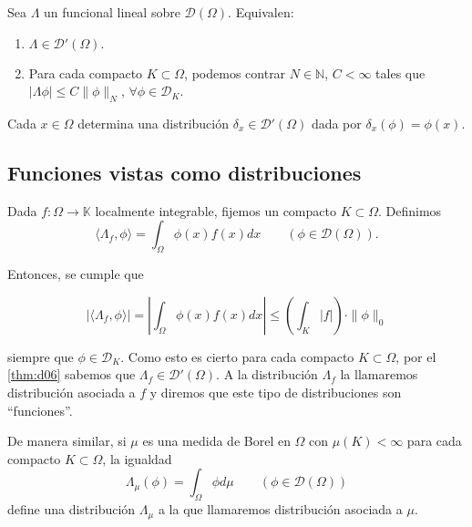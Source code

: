 \begin{teorema}\label{thm:d06}
Sea $\Lambda$ un funcional lineal sobre $\mathcal{D}(\Omega)$. Equivalen: 
\begin{enumerate}
\item $\Lambda\in \mathcal{D}'(\Omega).$
\item Para cada compacto $K\subset \Omega$, podemos contrar $N\in\mathds{N}$, $C<\infty$ tales que $\vert \Lambda\phi \vert \leq C \parallel \phi \parallel_{N}$, $\forall \phi \in \mathcal{D}_{K}$.
\end{enumerate}
\end{teorema}
\begin{observacion}
Cada $x\in\Omega$ determina una distribución $\delta_{x}\in\mathcal{D}'(\Omega)$ dada por $\delta_{x}(\phi) = \phi(x)$.
\end{observacion}

\subsection{Funciones vistas como distribuciones} %


Dada $f:\Omega\rightarrow\mathds{K} $ localmente integrable, fijemos un compacto $K\subset\Omega$. Definimos $$\langle \Lambda_{f}, \phi\rangle = \int_{\Omega}\phi(x)f(x)dx \qquad (\phi\in\mathcal{D}(\Omega)).$$

Entonces, se cumple que 

\begin{equation}
\vert \langle \Lambda_{f},\phi \rangle \vert = \left\vert \int_{\Omega}\phi(x)f(x)dx \right\vert \leq \left( \int_{K} \vert f \vert \right) \cdot \parallel\phi\parallel_{0}
\end{equation}

siempre que $\phi\in \mathcal{D}_{K}$. Como esto es cierto para cada compacto $K\subset\Omega$, por el \autoref{thm:d06} sabemos que $\Lambda_{f}\in\mathcal{D}'(\Omega)$. A la distribución $\Lambda_{f}$ la llamaremos distribución asociada a $f$ y diremos que este tipo de distribuciones son ``funciones''. 

De manera similar, si $\mu$ es una medida de Borel en $\Omega$ con $\mu (K)<\infty$ para cada compacto $K\subset\Omega$, la igualdad
\begin{equation}
\Lambda_{\mu}(\phi) = \int_{\Omega} \phi d\mu \qquad (\phi\in \mathcal{D}(\Omega))
\end{equation}
define una distribución $\Lambda_{\mu}$ a la que llamaremos distribución asociada a $\mu$. 

